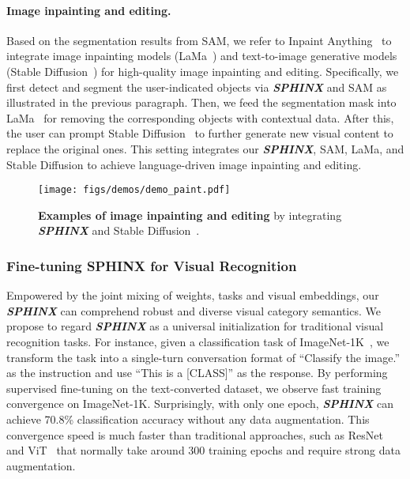 \documentclass{article} \usepackage{iclr2024_conference,times}
\begin{document}
\paragraph{Image inpainting and editing.}
Based on the segmentation results from SAM, we refer to Inpaint Anything~\citep{yu2023inpaint} to integrate image inpainting models (LaMa~\citep{suvorov2021resolution}) and text-to-image generative models (Stable Diffusion~\citep{rombach2021highresolution}) for high-quality image inpainting and editing. Specifically, we first detect and segment the user-indicated objects via \textcolor{Goldenrod3}{\textbf{\textit{SPHINX}}} and SAM as illustrated in the previous paragraph. Then, we feed the segmentation mask into LaMa~\citep{suvorov2021resolution} for removing the corresponding objects with contextual data. After this, the user can prompt Stable Diffusion~\citep{rombach2021highresolution} to further generate new visual content to replace the original ones. This setting integrates our \textcolor{Goldenrod3}{\textbf{\textit{SPHINX}}}, SAM, LaMa, and Stable Diffusion to achieve language-driven image inpainting and editing.


\begin{figure}[t]
    \centering
\texttt{[image: figs/demos/demo\_paint.pdf]}
    \caption{\textbf{Examples of image inpainting and editing} by integrating \textcolor{Goldenrod3}{\textbf{\textit{SPHINX}}} and Stable Diffusion~\citep{rombach2021highresolution}.
    }
    \label{fig:demo_paint}
\end{figure}

\subsubsection{Fine-tuning SPHINX for Visual Recognition}

Empowered by the joint mixing of weights, tasks and visual embeddings, our \textcolor{Goldenrod3}{\textbf{\textit{SPHINX}}} can comprehend robust and diverse visual category semantics. We propose to regard \textcolor{Goldenrod3}{\textbf{\textit{SPHINX}}} as a universal initialization for traditional visual recognition tasks. For instance, given a classification task of ImageNet-1K~\citep{russakovsky2015imagenet}, we transform the task into a single-turn conversation format of ``Classify the image.'' as the instruction and use ``This is a [CLASS]'' as the response. By performing supervised fine-tuning on the text-converted dataset, we observe fast training convergence on ImageNet-1K. Surprisingly, with only one epoch, \textcolor{Goldenrod3}{\textbf{\textit{SPHINX}}} can achieve 70.8\% classification accuracy without any data augmentation. This convergence speed is much faster than traditional approaches, such as ResNet~\citep{resnet} and ViT~\citep{dosovitskiy2020image} that normally take around 300 training epochs and require strong data augmentation. 
\end{document}
